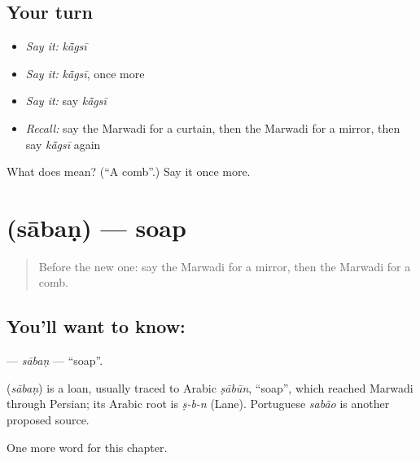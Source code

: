 \subsection*{Your turn}
\begin{itemize}
\raggedright
  \item \emph{Say it:} \emph{kā̃gsī}
  \item \emph{Say it:} \emph{kā̃gsī}, once more
  \item \emph{Say it:} say \emph{kā̃gsī}
  \item \emph{Recall:} say the Marwadi for a curtain, then the Marwadi for a mirror, then say \emph{kā̃gsī} again
\end{itemize}

\begin{tcolorbox}[breakable,colback=teal!4,colframe=teal!35!black,title={Before you move on}]
What does  mean? (\textquotedblleft{}A comb\textquotedblright{}.) Say it once more.
\end{tcolorbox}
\section[\texorpdfstring{\mw{साबण} (sābaṇ)}{साबण (sābaṇ)}]{ (sābaṇ) — soap}

\label{lesson:MW-C124-saban}



\begin{quote}
Before the new one: say the Marwadi for a mirror, then the Marwadi for a comb.
\end{quote}

\subsection*{You'll want to know: }
\textbf{} — \emph{sābaṇ} — \textquotedblleft{}soap\textquotedblright{}.

\begin{cousinweb}
\textbf{} (\emph{sābaṇ}) is a loan, usually traced to Arabic \emph{ṣābūn}, \textquotedblleft{}soap\textquotedblright{}, which reached Marwadi through Persian; its Arabic root is \emph{ṣ-b-n} (Lane). Portuguese \emph{sabão} is another proposed source.
\end{cousinweb}

\begin{grammarlens}[title={What you've built}]
One more word for this chapter.
\end{grammarlens}

